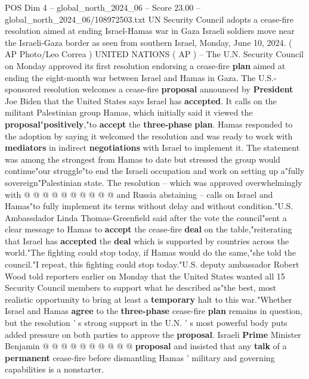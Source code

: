 \begin{textsample}{POS Dim 4 – global\_north\_2024\_06 – Score 23.00 – global\_north\_2024\_06/108972503.txt}  \label{ex:f4_pos_139}
UN Security Council adopts a cease-fire resolution aimed at ending Israel-Hamas war in Gaza Israeli soldiers move near the Israeli-Gaza border as seen from southern Israel, Monday, June 10, 2024. ( AP Photo/Leo Correa ) UNITED NATIONS ( AP ) -- The U.N.
Security Council on Monday approved its first resolution endorsing a cease-fire \textbf{plan} aimed at ending the eight-month war between Israel and Hamas in Gaza.
The U.S.-sponsored resolution welcomes a cease-fire \textbf{proposal} announced by \textbf{President} Joe Biden that the United States says Israel has \textbf{accepted}.
It calls on the militant Palestinian group Hamas, which initially said it viewed the \textbf{proposal}"\textbf{positively},"to \textbf{accept} the \textbf{three-phase} \textbf{plan}.
Hamas responded to the adoption by saying it welcomed the resolution and was ready to work with \textbf{mediators} in indirect \textbf{negotiations} with Israel to implement it.
The statement was among the strongest from Hamas to date but stressed the group would continue"our struggle"to end the Israeli occupation and work on setting up a"fully sovereign"Palestinian state.
The resolution -- which was approved overwhelmingly with @ @ @ @ @ @ @ @ @ @ and Russia abstaining -- calls on Israel and Hamas"to fully implement its terms without delay and without condition."U.S.
Ambassdador Linda Thomas-Greenfield said after the vote the council"sent a clear message to Hamas to \textbf{accept} the cease-fire \textbf{deal} on the table,"reiterating that Israel has \textbf{accepted} the \textbf{deal} which is supported by countries across the world."The fighting could stop today, if Hamas would do the same,"she told the council."I repeat, this fighting could stop today."U.S. deputy ambassador Robert Wood told reporters earlier on Monday that the United States wanted all 15 Security Council members to support what he described as"the best, most realistic opportunity to bring at least a \textbf{temporary} halt to this war."Whether Israel and Hamas \textbf{agree} to the \textbf{three-phase} cease-fire \textbf{plan} remains in question, but the resolution ' s strong support in the U.N. ' s most powerful body puts added pressure on both parties to approve the \textbf{proposal}.
Israeli \textbf{Prime} Minister Benjamin @ @ @ @ @ @ @ @ @ @ \textbf{proposal} and insisted that any \textbf{talk} of a \textbf{permanent} cease-fire before dismantling Hamas ' military and governing capabilities is a nonstarter.

\end{textsample}
